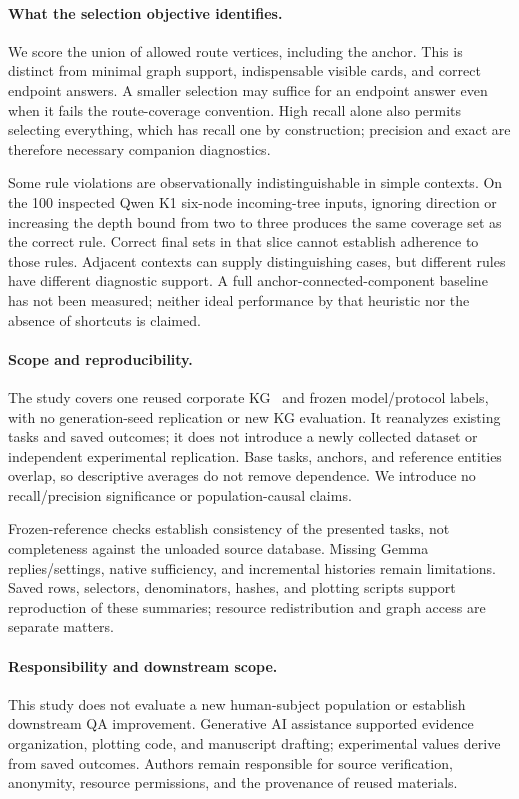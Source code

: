 \paragraph{What the selection objective identifies.}
We score the union of allowed route vertices, including the anchor. This is distinct from minimal graph support, indispensable visible cards, and correct endpoint answers. A smaller selection may suffice for an endpoint answer even when it fails the route-coverage convention. High recall alone also permits selecting everything, which has recall one by construction; precision and exact are therefore necessary companion diagnostics.

Some rule violations are observationally indistinguishable in simple contexts. On the 100 inspected Qwen K1 six-node incoming-tree inputs, ignoring direction or increasing the depth bound from two to three produces the same coverage set as the correct rule. Correct final sets in that slice cannot establish adherence to those rules. Adjacent contexts can supply distinguishing cases, but different rules have different diagnostic support. A full anchor-connected-component baseline has not been measured; neither ideal performance by that heuristic nor the absence of shortcuts is claimed.

\paragraph{Scope and reproducibility.}
The study covers one reused corporate KG~\cite{kirpichev2026towards} and frozen model/protocol labels, with no generation-seed replication or new KG evaluation. It reanalyzes existing tasks and saved outcomes; it does not introduce a newly collected dataset or independent experimental replication. Base tasks, anchors, and reference entities overlap, so descriptive averages do not remove dependence. We introduce no recall/precision significance or population-causal claims.

Frozen-reference checks establish consistency of the presented tasks, not completeness against the unloaded source database. Missing Gemma replies/settings, native sufficiency, and incremental histories remain limitations. Saved rows, selectors, denominators, hashes, and plotting scripts support reproduction of these summaries; resource redistribution and graph access are separate matters.

\paragraph{Responsibility and downstream scope.}
This study does not evaluate a new human-subject population or establish downstream QA improvement. Generative AI assistance supported evidence organization, plotting code, and manuscript drafting; experimental values derive from saved outcomes. Authors remain responsible for source verification, anonymity, resource permissions, and the provenance of reused materials.
